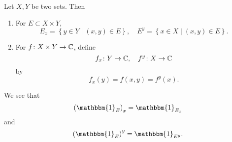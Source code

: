 \begin{definition}
  Let \(X, Y\) be two sets. Then
  \begin{enumerate}
    \item For \(E\subset X\times Y\),
          \[
            E_x = \left\{y\in Y \mid (x, y)\in E\right\},\quad E^y = \left\{x\in X \mid (x, y)\in E\right\}.
          \]
    \item For \(f\colon X\times Y\to \mathbb{\MakeUppercase{c}} \), define
          \[
            f_x\colon Y\to \mathbb{\MakeUppercase{c}} ,\quad f^y\colon X\to \mathbb{\MakeUppercase{c}}
          \]
          by
          \[
            f_x(y) = f(x, y) = f^y(x).
          \]
  \end{enumerate}
\end{definition}
\begin{eg}
  We see that
  \[
    \left(\mathbbm{1}_{E} \right)_x = \mathbbm{1}_{E_x}
  \]
  and
  \[
    \left(\mathbbm{1}_{E} \right)^y = \mathbbm{1}_{E^y}.
  \]
\end{eg}

